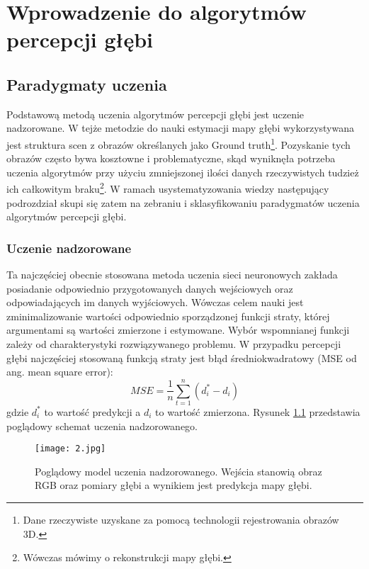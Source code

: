 \chapter{Wprowadzenie do algorytmów percepcji głębi}\label{chap:2_wprowadzenie_do_algorytmów_percepcji_głębi}

\section{Paradygmaty uczenia}
Podstawową metodą uczenia algorytmów percepcji głębi jest uczenie nadzorowane. W tejże metodzie do nauki estymacji mapy głębi wykorzystywana jest struktura scen z obrazów określanych jako Ground truth\footnote{Dane rzeczywiste uzyskane za pomocą technologii rejestrowania obrazów 3D.}. Pozyskanie tych obrazów często bywa kosztowne i problematyczne, skąd wyniknęła potrzeba uczenia algorytmów przy użyciu zmniejszonej ilości danych rzeczywistych tudzież ich całkowitym braku\footnote{Wówczas mówimy o rekonstrukcji mapy głębi.}. W ramach usystematyzowania wiedzy następujący podrozdział skupi się zatem na zebraniu i sklasyfikowaniu paradygmatów uczenia algorytmów percepcji głębi.

\subsection{Uczenie nadzorowane}
Ta najczęściej obecnie stosowana metoda uczenia sieci neuronowych zakłada posiadanie odpowiednio przygotowanych danych wejściowych oraz odpowiadających im danych wyjściowych. Wówczas celem nauki jest zminimalizowanie wartości odpowiednio sporządzonej funkcji straty, której argumentami są wartości zmierzone i estymowane. Wybór wspomnianej funkcji zależy od charakterystyki rozwiązywanego problemu. W przypadku percepcji głębi najczęściej stosowaną funkcją straty jest błąd średniokwadratowy (MSE od ang. mean square error):
\begin{equation} \label{eq:1}
MSE = \frac{1}{n} \sum_{t=1}^{n} (d_i^* - d_i)
\end{equation}
gdzie \( d_i^* \) to wartość predykcji a \( d_i \) to wartość zmierzona.
Rysunek \ref{fig:uczenie-nadzorowane} przedstawia poglądowy schemat uczenia nadzorowanego.
\begin{figure}[H]
    \centering
    \texttt{[image: 2.jpg]}
    \caption{Poglądowy model uczenia nadzorowanego. Wejścia stanowią obraz RGB oraz pomiary głębi a wynikiem jest predykcja mapy głębi.}
    \label{fig:uczenie-nadzorowane}
\end{figure}

